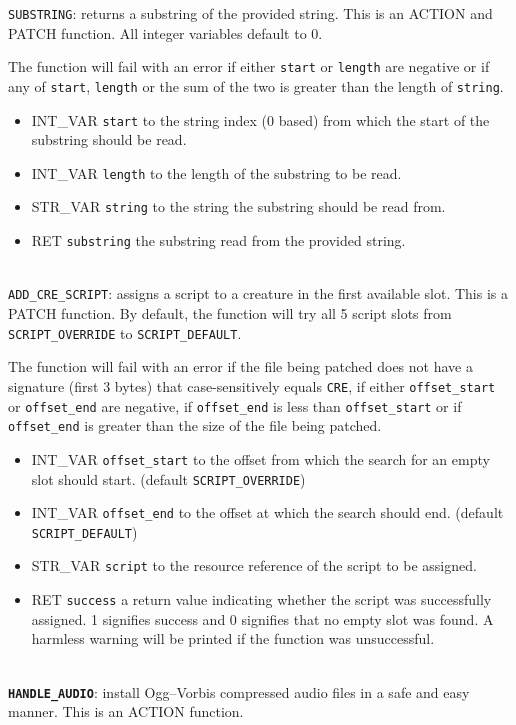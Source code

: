 \documentclass{article}
\def\DEFINE#1{{\tt \bf #1}\label{#1}\index{#1}}
\def\t#1{{\tt #1}}
\begin{document}
\verb+SUBSTRING+: returns a substring of the provided string. This is an ACTION and PATCH function. All integer variables default to 0.

The function will fail with an error if either \verb+start+ or \verb+length+ are negative or if any of \verb+start+, \verb+length+ or the sum of the two is greater than the length of \verb+string+.
\begin{itemize}
\item INT_VAR \verb+start+ to the string index (0 based) from which the start of the substring should be read.
\item INT_VAR \verb+length+ to the length of the substring to be read.
\item STR_VAR \verb+string+ to the string the substring should be read from.
\item RET \verb+substring+ the substring read from the provided string.
\end{itemize}
\\

\verb+ADD_CRE_SCRIPT+: assigns a script to a creature in the first available slot. This is a PATCH function. By default, the function will try all 5 script slots from \verb+SCRIPT_OVERRIDE+ to \verb+SCRIPT_DEFAULT+.

The function will fail with an error if the file being patched does not have a signature (first 3 bytes) that case-sensitively equals \t{CRE}, if either \verb+offset_start+ or \verb+offset_end+ are negative, if \verb+offset_end+ is less than \verb+offset_start+ or if \verb+offset_end+ is greater than the size of the file being patched.
\begin{itemize}
\item INT_VAR \verb+offset_start+ to the offset from which the search for an empty slot should start. (default \verb+SCRIPT_OVERRIDE+)
\item INT_VAR \verb+offset_end+ to the offset at which the search should end. (default \verb+SCRIPT_DEFAULT+)
\item STR_VAR \verb+script+ to the resource reference of the script to be assigned.
\item RET \verb+success+ a return value indicating whether the script was successfully assigned. 1 signifies success and 0 signifies that no empty slot was found. A harmless warning will be printed if the function was unsuccessful.
\end{itemize}
\\

\DEFINE{\verb+HANDLE_AUDIO+}: install Ogg--Vorbis compressed audio files in a safe and easy manner. This is an ACTION function.
\end{document}
